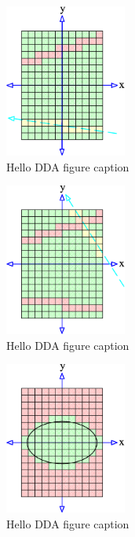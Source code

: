 	\begin{figure}
	  \centering
	  \includegraphics[width=4cm]{Space_Carving_2.png}
	  \caption{Hello DDA figure caption }\label{fig:SC-two-figsB}
	\end{figure}
	\begin{figure}
	  \centering
	  \includegraphics[width=4cm]{Space_Carving_3.png}
	  \caption{Hello DDA figure caption}\label{fig:SC-three-figsB}
	\end{figure}
	\begin{figure}
	  \centering
	  \includegraphics[width=4cm]{Space_Carving_4.png}
	  \caption{Hello DDA figure caption}\label{fig:SC-four-figsB}
	\end{figure}
\endinput 
